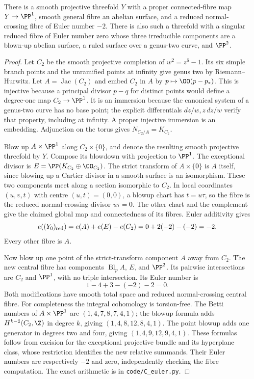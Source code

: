 
\begin{proposition}\label{cdp:st:C2b}
There is a smooth projective threefold $Y$ with a proper connected-fibre map $Y\to\PP^1$, smooth general fibre an abelian surface, and a reduced normal-crossing fibre of Euler number $-2$. There is also such a threefold with a singular reduced fibre of Euler number zero whose three irreducible components are a blown-up abelian surface, a ruled surface over a genus-two curve, and $\PP^2$.
\end{proposition}
\begin{proof}
Let $C_2$ be the smooth projective completion of $w^2=z^6-1$. Its six simple branch points and the unramified points at infinity give genus two by Riemann--Hurwitz. Let $A=\operatorname{Jac}(C_2)$ and embed $C_2$ in $A$ by $p\mapsto\OO(p-p_*)$. This is injective because a principal divisor $p-q$ for distinct points would define a degree-one map $C_2\to\PP^1$. It is an immersion because the canonical system of a genus-two curve has no base point; the explicit differentials $dz/w,z\,dz/w$ verify that property, including at infinity. A proper injective immersion is an embedding. Adjunction on the torus gives $N_{C_2/A}=K_{C_2}$.

Blow up $A\times\PP^1$ along $C_2\times\{0\}$, and denote the resulting smooth projective threefold by $Y$. Compose its blowdown with projection to $\PP^1$. The exceptional divisor is $E=\PP(K_{C_2}\oplus\OO_{C_2})$. The strict transform of $A\times\{0\}$ is $A$ itself, since blowing up a Cartier divisor in a smooth surface is an isomorphism. These two components meet along a section isomorphic to $C_2$. In local coordinates $(u,v,t)$ with centre $(u,t)=(0,0)$, a blowup chart has $t=u\tau$, so the fibre is the reduced normal-crossing divisor $u\tau=0$. The other chart and the complement give the claimed global map and connectedness of its fibres. Euler additivity gives
\[
 e((Y_0)_{\rm red})=e(A)+e(E)-e(C_2)=0+2(-2)-(-2)=-2.
\]
Every other fibre is $A$.

Now blow up one point of the strict-transform component $A$ away from $C_2$. The new central fibre has components $\operatorname{Bl}_pA$, $E$, and $\PP^2$. Its pairwise intersections are $C_2$ and $\PP^1$, with no triple intersection. Its Euler number is
\[
1-4+3-(-2)-2=0.
\]
Both modifications have smooth total space and reduced normal-crossing central fibre. For completeness the integral cohomology is torsion-free. The Betti numbers of $A\times\PP^1$ are $(1,4,7,8,7,4,1)$; the blowup formula adds $H^{k-2}(C_2,\Z)$ in degree $k$, giving $(1,4,8,12,8,4,1)$. The point blowup adds one generator in degrees two and four, giving $(1,4,9,12,9,4,1)$. These formulas follow from excision for the exceptional projective bundle and its hyperplane class, whose restriction identifies the new relative summands. Their Euler numbers are respectively $-2$ and zero, independently checking the fibre computation. The exact arithmetic is in \texttt{code/C\_euler.py}.
\end{proof}


